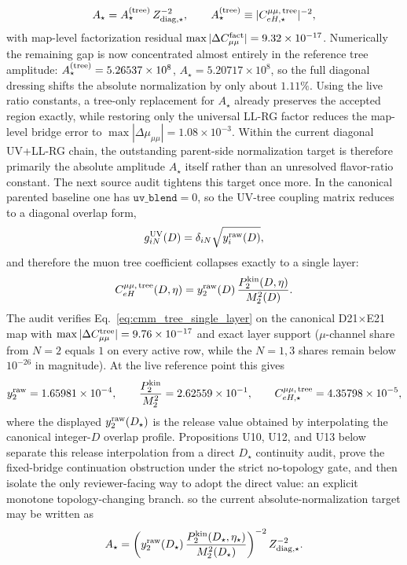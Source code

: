 \documentclass[aps,prd,onecolumn,notitlepage,nofootinbib,superscriptaddress,11pt,floatfix]{revtex4-2}
\begin{document}
\[
A_\star=A_\star^{\rm(tree)}\,Z_{{\rm diag},\star}^{-2},
\qquad
A_\star^{\rm(tree)}\equiv |C_{eH,\star}^{\mu\mu,\,\rm tree}|^{-2},
\]
with map-level factorization residual $\max|\Delta C_{\mu\mu}^{\rm fact}|=9.32\times10^{-17}$. Numerically the remaining gap is now concentrated almost entirely in the reference tree amplitude: $A_\star^{\rm(tree)}=5.26537\times10^{8}$, $A_\star=5.20717\times10^{8}$, so the full diagonal dressing shifts the absolute normalization by only about $1.11\%$. Using the live ratio constants, a tree-only replacement for $A_\star$ already preserves the accepted region exactly, while restoring only the universal LL-RG factor reduces the map-level bridge error to $\max|\Delta\mu_{\mu\mu}|=1.08\times10^{-3}$. Within the current diagonal UV+LL-RG chain, the outstanding parent-side normalization target is therefore primarily the absolute amplitude $A_\star$ itself rather than an unresolved flavor-ratio constant.
The next source audit tightens this target once more. In the canonical parented baseline one has $\texttt{uv\_blend}=0$, so the UV-tree coupling matrix reduces to a diagonal overlap form,
\[
g_{iN}^{\rm UV}(D)=\delta_{iN}\sqrt{y_{i}^{\rm raw}(D)},
\]
and therefore the muon tree coefficient collapses exactly to a single layer:
\begin{equation}
C_{eH}^{\mu\mu,\,\rm tree}(D,\eta)
=
y_2^{\rm raw}(D)\,
\frac{P_2^{\rm kin}(D,\eta)}{M_2^2(D)}.
\label{eq:cmm_tree_single_layer}
\end{equation}
The audit  verifies Eq.~\eqref{eq:cmm_tree_single_layer} on the canonical D21$\times$E21 map with $\max|\Delta C_{\mu\mu}^{\rm tree}|=9.76\times10^{-17}$ and exact layer support ($\mu$-channel share from $N=2$ equals $1$ on every active row, while the $N=1,3$ shares remain below $10^{-26}$ in magnitude). At the live reference point this gives
\[
y_2^{\rm raw}=1.65981\times10^{-4},\qquad
\frac{P_2^{\rm kin}}{M_2^2}=2.62559\times10^{-1},\qquad
C_{eH,\star}^{\mu\mu,\,\rm tree}=4.35798\times10^{-5},
\]
where the displayed \(y_2^{\rm raw}(D_\star)\) is the release value obtained by interpolating the canonical integer-\(D\) overlap profile.  Propositions U10, U12, and U13 below separate this release interpolation from a direct \(D_\star\) continuity audit, prove the fixed-bridge continuation obstruction under the strict no-topology gate, and then isolate the only reviewer-facing way to adopt the direct value: an explicit monotone topology-changing branch.
so the current absolute-normalization target may be written as
\[
A_\star
=
\left(
y_2^{\rm raw}(D_\star)\,
\frac{P_2^{\rm kin}(D_\star,\eta_\star)}{M_2^2(D_\star)}
\right)^{-2}
Z_{{\rm diag},\star}^{-2}.
\]
\end{document}
